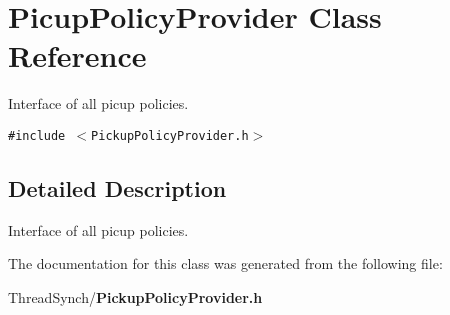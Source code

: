\section{Picup\-Policy\-Provider Class Reference}
\label{class_picup_policy_provider}
Interface of all picup policies.  


{\tt \#include $<$Pickup\-Policy\-Provider.h$>$}



\subsection{Detailed Description}
Interface of all picup policies. 



The documentation for this class was generated from the following file:\begin{CompactItemize}
\item 
Thread\-Synch/{\bf Pickup\-Policy\-Provider.h}\end{CompactItemize}
